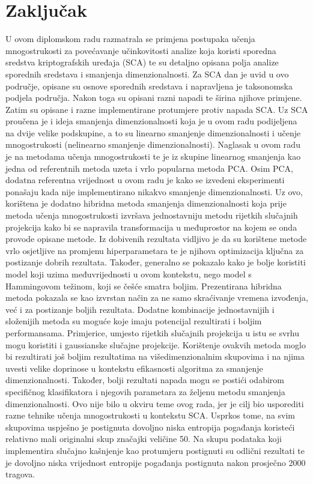 \documentclass[times, utf8, diplomski]{fer}
\begin{document}
\chapter{Zaključak}
U ovom diplomskom radu razmatrala se primjena postupaka učenja mnogostrukosti za povećavanje učinkovitosti analize koja koristi sporedna sredstva kriptografskih uređaja (SCA) te su detaljno opisana polja analize sporednih sredstava i smanjenja dimenzionalnosti. Za SCA dan je uvid u ovo područje, opisane su osnove sporednih sredstava i napravljena je taksonomska podjela područja. Nakon toga su opisani razni napadi te širina njihove primjene. Zatim su opisane i razne implementirane protumjere protiv napada SCA. Uz SCA proučena je i ideja smanjenja dimenzionalnosti koja je u ovom radu podijeljena na dvije velike podskupine, a to su linearno smanjenje dimenzionalnosti i učenje mnogostrukosti (nelinearno smanjenje dimenzionalnosti). Naglasak u ovom radu je na metodama učenja mnogostrukosti te je iz skupine linearnog smanjenja kao jedna od referentnih metoda uzeta i vrlo popularna metoda PCA. Osim PCA, dodatna referentna vrijednost u ovom radu je kako se izvedeni eksperimenti ponašaju kada nije implementirano nikakvo smanjenje dimenzionalnosti. Uz ovo, korištena je dodatno hibridna metoda smanjenja dimenzionalnosti koja prije metoda učenja mnogostrukosti izvršava jednostavniju metodu rijetkih slučajnih projekcija kako bi se napravila transformacija u međuprostor na kojem se onda provode opisane metode. Iz dobivenih rezultata vidljivo je da su korištene metode vrlo osjetljive na promjenu hiperparametara te je njihova optimizacija ključna za postizanje dobrih rezultata. Također, generalno se pokazalo kako je bolje koristiti model koji uzima međuvrijednosti u ovom kontekstu, nego model s Hammingovom težinom, koji se češće smatra boljim. Prezentirana hibridna metoda pokazala se kao izvrstan način za ne samo skraćivanje vremena izvođenja, već i za postizanje boljih rezultata. Dodatne kombinacije jednostavnijih i složenijih metoda su moguće koje imaju potencijal rezultirati i boljim performansama. Primjerice, umjesto rijetkih slučajnih projekcija u istu se svrhu mogu koristiti i gaussianske slučajne projekcije. Korištenje ovakvih metoda moglo bi rezultirati još boljim rezultatima na višedimenzionalnim skupovima i na njima uvesti velike doprinose u kontekstu efikasnosti algoritma za smanjenje dimenzionalnosti. Također, bolji rezultati napada mogu se postići odabirom specifičnog klasifikatora i njegovih parametara za željenu metodu smanjenja dimenzionalnosti. Ovo nije bilo u okviru teme ovog rada, jer je cilj bio usporediti razne tehnike učenja mnogostrukosti u kontekstu SCA. Usprkos tome, na svim skupovima uspješno je postignuta dovoljno niska entropija pogađanja koristeći relativno mali originalni skup značajki veličine 50. Na skupu podataka koji implementira slučajno kašnjenje kao protumjeru postignuti su odlični rezultati te je dovoljno niska vrijednost entropije pogađanja postignuta nakon prosječno 2000 tragova.
\end{document}
